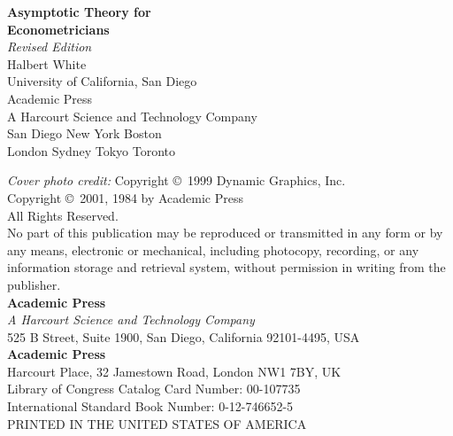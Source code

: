 
\begin{titlepage}
\centering
\vspace*{3cm}
{\LARGE\bfseries Asymptotic Theory for\\[0.5em] Econometricians}\\[1.5cm]
{\large\itshape Revised Edition}\\[3cm]
{\Large Halbert White}\\[1cm]
{\large University of California, San Diego}\\[4cm]
\vfill
{\large Academic Press}\\[0.3cm]
{\small A Harcourt Science and Technology Company}\\[0.5cm]
{\small San Diego \quad New York \quad Boston\\
London \quad Sydney \quad Tokyo \quad Toronto}
\end{titlepage}

\thispagestyle{empty}
\vspace*{\fill}
\noindent\textit{Cover photo credit:} Copyright \copyright\ 1999 Dynamic Graphics, Inc.\\[1em]
\noindent Copyright \copyright\ 2001, 1984 by Academic Press\\[0.5em]
\noindent All Rights Reserved.\\
No part of this publication may be reproduced or transmitted in any form or by any
means, electronic or mechanical, including photocopy, recording, or any information
storage and retrieval system, without permission in writing from the publisher.\\[1em]
\noindent\textbf{Academic Press}\\
\textit{A Harcourt Science and Technology Company}\\
525 B Street, Suite 1900, San Diego, California 92101-4495, USA\\[0.5em]
\noindent\textbf{Academic Press}\\
Harcourt Place, 32 Jamestown Road, London NW1 7BY, UK\\[1em]
\noindent Library of Congress Catalog Card Number: 00-107735\\
International Standard Book Number: 0-12-746652-5\\[1em]
\noindent PRINTED IN THE UNITED STATES OF AMERICA
\clearpage
